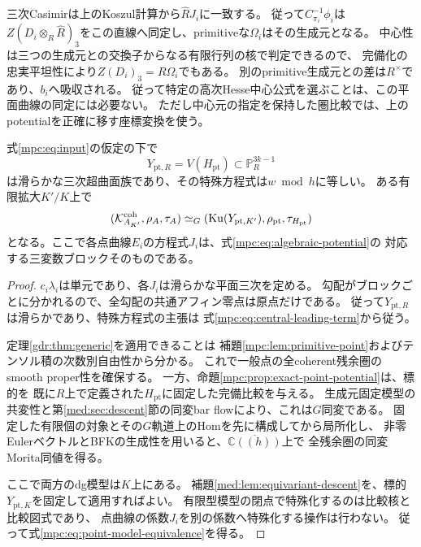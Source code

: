 \begin{remark}[中心生成元の自由度]
三次Casimirは上のKoszul計算から$\widehat R J_i$に一致する。
従って$C_{\pi_i}^{-1}\phi_i$は
$Z(D_i\otimes_R\widehat R)_3$をこの直線へ同定し、primitiveな$\Omega_i$はその生成元となる。
中心性は三つの生成元との交換子からなる有限行列の核で判定できるので、
完備化の忠実平坦性により$Z(D_i)_3=R\Omega_i$でもある。
別のprimitive生成元との差は$R^\times$であり、$b_i$へ吸収される。
従って特定の高次Hesse中心公式を選ぶことは、この平面曲線の同定には必要ない。
ただし中心元の指定を保持した圏比較では、上のpotentialを正確に移す座標変換を使う。
\end{remark}

\begin{theorem}[点三次の和への同変一般点比較]
\label{mpc:thm:point-model}
式\eqref{mpc:eq:input}の仮定の下で
\[
 Y_{\mathrm{pt},R}=V(H_{\mathrm{pt}})\subset\mathbb P^{3k-1}_R
\]
は滑らかな三次超曲面族であり、その特殊方程式は$w\bmod h$に等しい。
ある有限拡大$K'/K$上で
\begin{equation}\label{mpc:eq:point-model-equivalence}
 (\mathcal K^{\rm coh}_{A_{K'}},\rho_A,\tau_A)
 \simeq_G
 (\operatorname{Ku}(Y_{\mathrm{pt},K'}),\rho_{\mathrm{pt}},\tau_{H_{\mathrm{pt}}})
\end{equation}
となる。ここで各点曲線$E_i$の方程式$J_i$は、式\eqref{mpc:eq:algebraic-potential}の
対応する三変数ブロックそのものである。
\end{theorem}
\begin{proof}
$c_i\lambda_i$は単元であり、各$J_i$は滑らかな平面三次を定める。
勾配がブロックごとに分かれるので、全勾配の共通アフィン零点は原点だけである。
従って$Y_{\mathrm{pt},R}$は滑らかであり、特殊方程式の主張は
式\eqref{mpc:eq:central-leading-term}から従う。

定理\ref{gdr:thm:generic}を適用できることは
補題\ref{mpc:lem:primitive-point}およびテンソル積の次数別自由性から分かる。
これで一般点の全coherent残余圏のsmooth proper性を確保する。
一方、命題\ref{mpc:prop:exact-point-potential}は、標的を
既に$R$上で定義された$H_{\mathrm{pt}}$に固定した完備比較を与える。
生成元固定模型の共変性と第\ref{med:sec:descent}節の同変bar flowにより、これは$G$同変である。
固定した有限個の対象とその$G$軌道上のHomを先に構成してから局所化し、
非零EulerベクトルとBFKの生成性を用いると、$\overline{\mathbb C((h))}$上で
全残余圏の同変Morita同値を得る。

ここで両方のdg模型は$K$上にある。
補題\ref{med:lem:equivariant-descent}を、標的$Y_{\mathrm{pt},K}$を固定して適用すればよい。
有限型模型の閉点で特殊化するのは比較核と比較図式であり、
点曲線の係数$J_i$を別の係数へ特殊化する操作は行わない。
従って式\eqref{mpc:eq:point-model-equivalence}を得る。
\end{proof}

